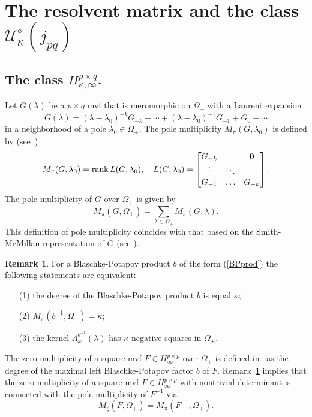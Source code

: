 \documentclass[12pt,twoside,a4paper]{amsart}
\theoremstyle{definition}
\newtheorem{remark}[thm]{Remark}
\numberwithin{equation}{section}
\begin{document}
\section{The resolvent matrix and the class ${{\mathcal U}}_\kappa^\circ(j_{pq})$}
\label{Sec4}
\subsection{The class $H_{\kappa,\infty}^{p\times q}$.}
Let  $G(\lambda)$ be a $p\times q$ mvf that is meromorphic on $\Omega_+$ with
a Laurent expansion
\begin{equation}\label{Gexp}
    G(\lambda)=(\lambda-\lambda_0)^{-k}G_{-k}+\cdots
+(\lambda-\lambda_0)^{-1}G_{-1}+G_0+\cdots
\end{equation}
 in a neighborhood of a pole $\lambda_0\in\Omega_+$. The pole
multiplicity $M_{\pi}(G, \lambda_0)$ is defined by (see~\cite{KL})
\begin{equation}\label{MTexp}
M_{\pi}(G, \lambda_0)={{\rm rank\,}} L(G,{\lambda}_0), \quad
L(G,{\lambda}_0)=\begin{bmatrix}
  G_{-k} &  & {\bf 0} \\
  \vdots & \ddots &  \\
  G_{-1} &\hdots & G_{-k}
\end{bmatrix}.
\end{equation}
The pole multiplicity of $G$ over $\Omega_+$ is given by
\begin{equation}\label{eq:7.11p}
  M_{\pi}(G, \Omega_+)=\sum_{\lambda\in\Omega_+}M_{\pi}(G, \lambda).
\end{equation}
This definition of pole multiplicity coincides with that based on the
Smith-McMillan representation of $G$ (see \cite{BGR}).
\begin{remark}\label{rem:3.1}
For a Blaschke-Potapov product $b$
of the form (\ref{BPprod}) the following statements are equivalent:
\begin{enumerate}
  \item[(1)] the degree of the Blaschke-Potapov product $b$ is equal $\kappa$;
  \vskip 6pt
  \item[(2)] $M_{\pi}(b^{-1}, \Omega_+)=\kappa$;\vskip 6pt
  \item[(3)] the kernel ${\mathsf \Lambda}_{\omega}^{b^{-1}}(\lambda)$ has $\kappa$ negative squares in $\Omega_+$.
\end{enumerate}
\end{remark}

The zero multiplicity of a square mvf $F\in H_\infty^{p\times p}$ over $\Omega_+$ is defined in~\cite{KL81}
as the degree of the maximal left Blaschke-Potapov factor $b$ of $F$.
Remark~\ref{rem:3.1} implies that
the zero multiplicity of a square mvf $F\in H_\infty^{p\times p}$ with nontrivial determinant is connected with the
pole multiplicity of  $F^{-1}$ via
\[
M_{\zeta}(F, \Omega_+)=M_{\pi}(F^{-1}, \Omega_+).
\]
\end{document}

